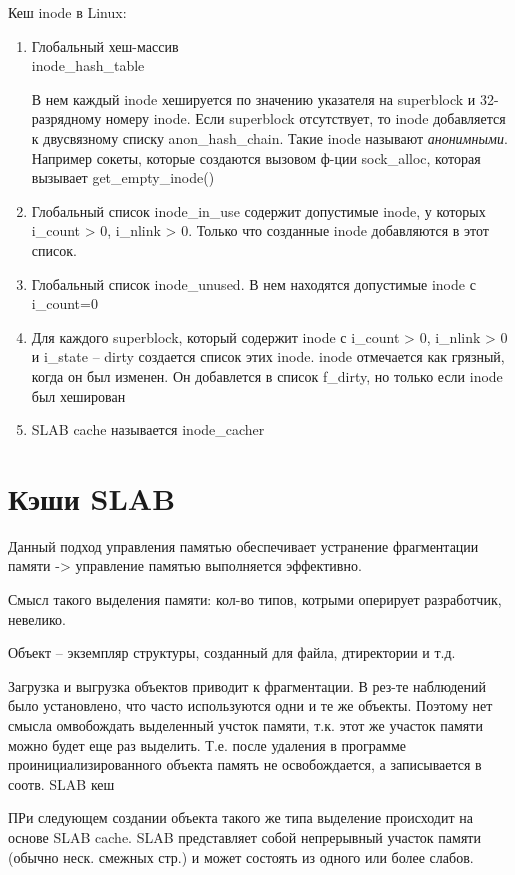 Кеш inode в Linux:
\begin{enumerate}
	\item Глобальный хеш-массив \\ inode\_hash\_table
	
	В нем каждый inode хешируется по значению указателя на superblock и 32-разрядному номеру inode. Если superblock отсутствует, то inode добавляется к двусвязному списку anon\_hash\_chain. Такие inode называют \textit{анонимными}. Например сокеты, которые создаются вызовом ф-ции sock\_alloc, которая вызывает get\_empty\_inode()
	
	\item Глобальный список inode\_in\_use содержит допустимые inode, у которых i\_count > 0, i\_nlink > 0.
	Только что созданные inode добавляются в этот список.
	
	\item Глобальный список inode\_unused. В нем находятся допустимые inode с i\_count=0
	
	\item Для каждого superblock, который содержит inode с i\_count > 0, i\_nlink > 0 и i\_state -- dirty создается список этих inode. inode отмечается как грязный, когда он был изменен. Он добавлется в список f\_dirty, но только если inode был хеширован
	
	\item SLAB cache называется inode\_cacher
	
\end{enumerate}


\section{Кэши SLAB}
Данный подход управления памятью обеспечивает устранение фрагментации памяти -> управление памятью выполняется эффективно.

Смысл такого выделения памяти:
кол-во типов, котрыми оперирует разработчик, невелико. 

Объект -- экземпляр структуры, созданный для файла, дтиректории и т.д.

 Загрузка и выгрузка объектов приводит к фрагментации. В рез-те наблюдений было установлено, что часто используются одни и те же объекты. Поэтому нет смысла омвобождать выделенный учсток памяти, т.к. этот же участок памяти можно будет еще раз выделить. Т.е. после удаления в программе проинициализированного объекта память не освобождается, а записывается в соотв. SLAB кеш 

ПРи следующем создании объекта такого же типа выделение происходит на основе SLAB cache. SLAB представляет собой непрерывный участок памяти (обычно неск. смежных стр.) и может состоять из одного или более слабов.


